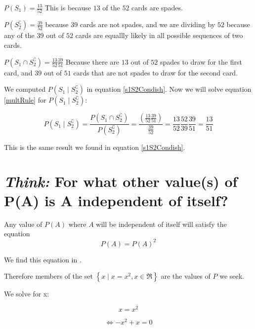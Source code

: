 \documentclass[a4paper,11pt]{article}
\begin{document}
$P\left( S_{1} \right) = \frac{13}{52}$  This is because $13$ of the 
$52$ cards are spades.

$ P\left( S_{2}^{\complement} \right) = \frac{39}{52}$ because $39$ 
cards are not spades, and we are dividing by $52$ because any of the 
$39$ out of $52$ cards are equallly likely in all possible sequences 
of two cards.


$P \left( S_{1} \cap S_{2}^{\complement} \right)
 = \frac{13}{52} \frac{39}{51}$
Because there are $13$ out of $52$ spades to draw for the first card,
and $39$ out of $51$ cards that are not spades to draw for the second
card.

We computed $P\left(S_{1} \mid S_{2}^{\complement} \right)$ in 
equation \ref{s1S2Condish}.  Now we will solve equation \ref{multRule} for 
$P\left(S_{1} \mid S_{2}^{\complement} \right)$:

\begin{equation} \label{multRule}
  P\left(S_{1} \mid S_{2}^{\complement}\right) = 
  \frac
  {
    P\left(S_{1} \cap S_{2}^{\complement}\right)
  }
  {
    P\left(S_{2}^{\complement}\right)
  } =
  \frac 
  { 
    \left( \frac{13}{52} \frac{39}{51} \right) 
  }
  {
    \frac{39}{52}
  } =
  \frac{13}{52} \frac{52}{39} \frac{39}{51} =
  \frac{13}{51}
\end{equation}

This is the same result we found in equation \ref{s1S2Condish}.

\section{\textit{Think:} For what other value(s) of P(A) is A 
independent of itself?}

Any value of $P\left(A\right)$ where $A$ will be independent of itself
will satisfy the equation
\begin{equation}
  P\left(A \right) = P\left(A \right)^{2}
\end{equation}

We find this equation in \cite{selfIndependent}.

Therefore members of the set $\left\{x \mid x=x^{2}, x\in \Re \right\}$ are
the values of $P$ we seek.

We solve for x:

\begin{equation} \label{selfSquare}
  x = x^{2}
\end{equation}

\begin{equation}
  \iff -x^{2} + x = 0
\end{equation}
\end{document}
